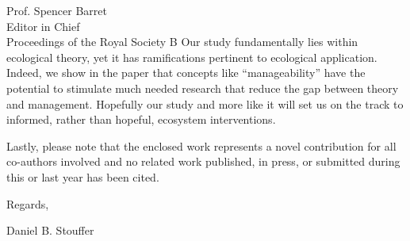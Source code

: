 \documentclass[10pt, a4paper]{letter}
\begin{document}
\begin{letter}{
       Prof. Spencer Barret\\
       Editor in Chief\\
       Proceedings of the Royal Society B}
Our study fundamentally lies within ecological theory, yet it has ramifications pertinent to ecological application. 
Indeed, we show in the paper that concepts like ``manageability'' have the potential to stimulate much needed research that reduce the gap between theory and management.
Hopefully our study and more like it will set us on the track to informed, rather than hopeful, ecosystem interventions. 

Lastly, please note that the enclosed work represents a novel contribution for all co-authors involved and no related work published, in press, or submitted during this or last year has been cited. 

\closing{Regards,}

Daniel B. Stouffer

\end{letter}
\end{document}
